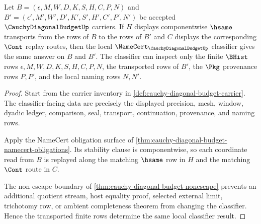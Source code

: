 \begin{theorem}
\label{thm:cauchy-diagonal-budget-classifier-stability}
Let $B=(\epsilon,M,W,D,K,S,H,C,P,N)$ and $B'=(\epsilon',M',W',D',K',S',H',C',P',N')$ be accepted $\CauchyDiagonalBudgetUp$ carriers. If $H$ displays componentwise $\hsame$ transports from the rows of $B$ to the rows of $B'$ and $C$ displays the corresponding $\Cont$ replay routes, then the local $\NameCert_{\CauchyDiagonalBudgetUp}$ classifier gives the same answer on $B$ and $B'$. The classifier can inspect only the finite $\BHist$ rows $\epsilon,M,W,D,K,S,H,C,P,N$, the transported rows of $B'$, the $\Pkg$ provenance rows $P,P'$, and the local naming rows $N,N'$.
\end{theorem}
\begin{proof}
Start from the carrier inventory in \autoref{def:cauchy-diagonal-budget-carrier}. The classifier-facing data are precisely the displayed precision, mesh, window, dyadic ledger, comparison, seal, transport, continuation, provenance, and naming rows.

Apply the NameCert obligation surface of \autoref{thm:cauchy-diagonal-budget-namecert-obligations}. Its stability clause is componentwise, so each coordinate read from $B$ is replayed along the matching $\hsame$ row in $H$ and the matching $\Cont$ route in $C$.

The non-escape boundary of \autoref{thm:cauchy-diagonal-budget-nonescape} prevents an additional quotient stream, host equality proof, selected external limit, trichotomy row, or ambient completeness theorem from changing the classifier. Hence the transported finite rows determine the same local classifier result.
\end{proof}

